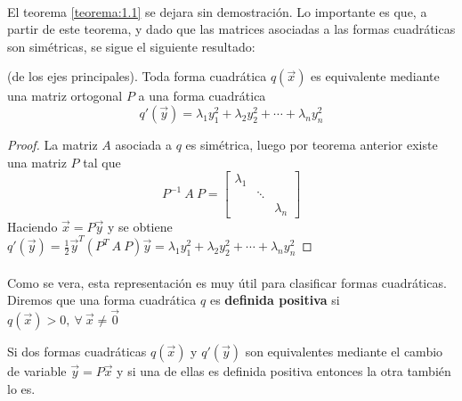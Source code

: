 \paragraph*{}
El teorema \ref{teorema:1.1} se dejara sin demostración. Lo importante es que, a partir de este teorema, y dado que las matrices asociadas a las formas cuadráticas son simétricas, se sigue el siguiente resultado:
\begin{theorem}(de los ejes principales).
Toda forma cuadrática $q(\overrightarrow{x})$ es equivalente mediante una matriz ortogonal $P$ a una forma cuadrática 
\begin{equation}
    q'(\overrightarrow{y}) = \lambda_{1}y_{1}^{2} + \lambda_{2}y_{2}^{2} + \cdots + \lambda_{n}y_{n}^{2}
\end{equation}
\label{teorema:1.2}
\end{theorem}
\begin{proof}
La matriz $A$ asociada a $q$ es simétrica, luego por teorema anterior existe una matriz $P$ tal que 
\begin{equation*}
    P^{-1}~A~P = \begin{bmatrix}
    \lambda_{1} & &\\
    & \ddots & \\
    & & \lambda_{n}
    \end{bmatrix}
    \label{ecuacion:1.4}
\end{equation*}
Haciendo $\overrightarrow{x} = P\overrightarrow{y}$ y se obtiene $q'(\overrightarrow{y}) = \frac{1}{2}\overrightarrow{y}^{T}\left(P^{T}~A~P\right)\overrightarrow{y} = \lambda_{1}y_{1}^{2} + \lambda_{2}y_{2}^{2} + \cdots + \lambda_{n}y_{n}^{2}$
\end{proof}
\paragraph*{}
Como se vera, esta representación es muy útil para clasificar formas cuadráticas. Diremos que una forma cuadrática $q$ es \textbf{definida positiva} si $q(\overrightarrow{x}) > 0, ~\forall~ \overrightarrow{x} \neq \overrightarrow{0}$ 
\begin{lemma}
Si dos formas cuadráticas $q(\overrightarrow{x})$ y $q'(\overrightarrow{y})$ son equivalentes mediante el cambio de variable $\overrightarrow{y} = P\overrightarrow{x}$ y si una de ellas es definida positiva entonces la otra también lo es.
\label{lema:1.3}
\end{lemma}

